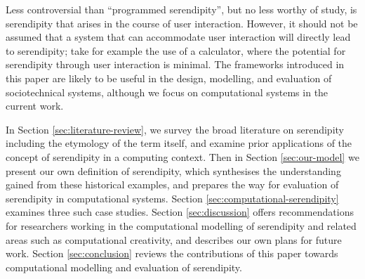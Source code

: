 Less controversial than ``programmed serendipity'', but no less worthy
of study, is serendipity that arises in the course of user
interaction.  However, it should not be assumed that a system that can
accommodate user interaction will directly lead to serendipity; take
for example the use of a calculator, where the potential for
serendipity through user interaction is minimal.  The frameworks
introduced in this paper are likely to be useful in the design,
modelling, and evaluation of sociotechnical systems, although we focus
on computational systems in the current work.

In Section \ref{sec:literature-review}, we survey the broad literature
on serendipity including the etymology of the term itself, and examine
prior applications of the concept of serendipity in a computing
context.  Then in Section \ref{sec:our-model} we present our own
definition of serendipity, which synthesises the understanding gained
from these historical examples, and prepares the way for evaluation of
serendipity in computational systems.  Section
\ref{sec:computational-serendipity} examines three such case studies.
Section \ref{sec:discussion} offers recommendations for researchers
working in the computational modelling of serendipity and related
areas such as computational creativity, and describes our own plans
for future work.  Section \ref{sec:conclusion} reviews the
contributions of this paper towards computational modelling and
evaluation of serendipity.


